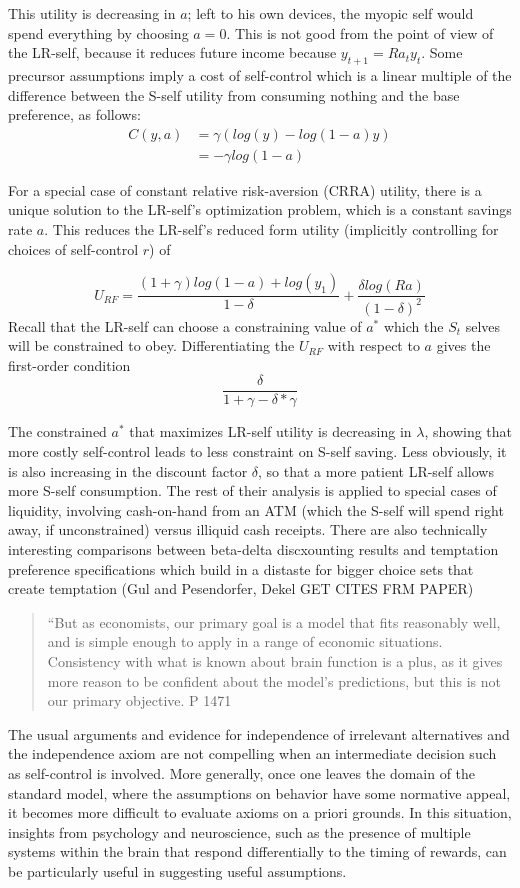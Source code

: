 \documentclass{article}
\begin{document}
This utility is decreasing in $a$; left to his own devices, the myopic self would spend everything by choosing $a=0$. This is not good from the point of view of the LR-self, because it reduces future income because $y_{t+1}=Ra_ty_t$.
Some precursor assumptions imply a cost of self-control which is a linear multiple of the difference between the S-self utility from consuming nothing and the base preference, as follows:
\begin{equation}
	\begin{split}		
	C(y,a) &= \gamma (log(y)-log(1-a)y)\\
	&=-\gamma log(1-a)
\end{split}
\end{equation}

For a special case of constant relative risk-aversion  (CRRA) utility, there is a unique solution to the LR-self’s optimization problem, which is a constant savings rate $a$. This reduces the LR-self’s reduced form utility (implicitly controlling for choices of self-control $r$) of  

\[ U_{RF} = \frac{(1+\gamma)log(1-a)+log(y_1)}{1-\delta} +\frac{\delta log(Ra)}{(1-\delta)^2}
\]
Recall that the LR-self can choose a constraining value of $a^*$ which the $S_t$ selves will be constrained to obey. Differentiating the $U_{RF}$ with respect to $a$ gives the first-order condition 
\[\frac{\delta}{1+\gamma-\delta*\gamma}\]

The constrained $a^*$ that maximizes LR-self utility is decreasing in $\lambda$, showing that more costly self-control leads to less constraint on S-self saving. Less obviously, it is also increasing in the discount factor $\delta$, so that a more patient LR-self allows more S-self consumption. 
The rest of their analysis is applied to special cases of liquidity, involving cash-on-hand from an ATM (which the S-self will spend right away, if unconstrained) versus illiquid cash receipts. There are also technically interesting comparisons between beta-delta discxounting results and temptation preference specifications which build in a distaste for bigger choice sets that create temptation (Gul and Pesendorfer, Dekel GET CITES FRM PAPER)

\begin{quote}
	“But as economists, our primary goal is a 
model that fits reasonably well, and is simple enough to 
apply in a range of economic situations. Consistency with 
what is known about brain function is a plus, as it gives 
more reason to be confident about the model's predictions, 
but this is not our primary objective. P 1471
\end{quote}
The usual arguments and evidence for independence of irrelevant alternatives and the independence axiom are not compelling when an intermediate 
decision such as self-control is involved. More generally, once one leaves the domain of the 
standard model, where the assumptions on behavior have some normative appeal, it becomes more difficult to evaluate axioms on a priori 
grounds. In this situation, insights from psychology and neuroscience, such as the presence of multiple systems within the brain that respond differentially to the timing of rewards, can be particularly useful in suggesting useful assumptions.
\end{document}
